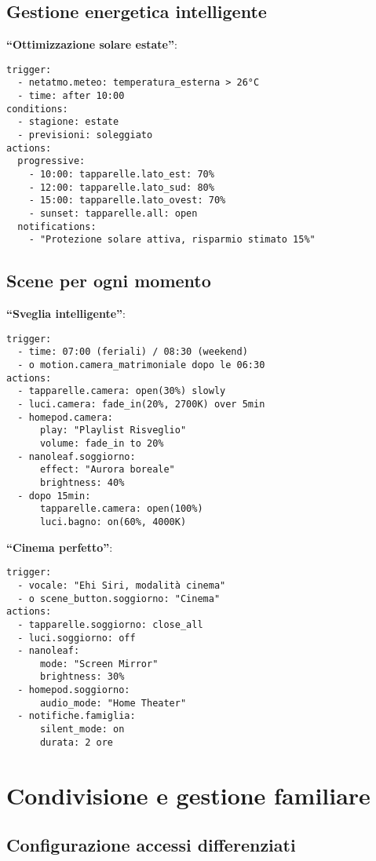 \subsection{Gestione energetica intelligente}

\textbf{``Ottimizzazione solare estate''}:
\begin{verbatim}
trigger:
  - netatmo.meteo: temperatura_esterna > 26°C
  - time: after 10:00
conditions:
  - stagione: estate
  - previsioni: soleggiato
actions:
  progressive:
    - 10:00: tapparelle.lato_est: 70%
    - 12:00: tapparelle.lato_sud: 80%
    - 15:00: tapparelle.lato_ovest: 70%
    - sunset: tapparelle.all: open
  notifications:
    - "Protezione solare attiva, risparmio stimato 15%"
\end{verbatim}

\subsection{Scene per ogni momento}

\textbf{``Sveglia intelligente''}:
\begin{verbatim}
trigger:
  - time: 07:00 (feriali) / 08:30 (weekend)
  - o motion.camera_matrimoniale dopo le 06:30
actions:
  - tapparelle.camera: open(30%) slowly
  - luci.camera: fade_in(20%, 2700K) over 5min
  - homepod.camera: 
      play: "Playlist Risveglio"
      volume: fade_in to 20%
  - nanoleaf.soggiorno: 
      effect: "Aurora boreale"
      brightness: 40%
  - dopo 15min:
      tapparelle.camera: open(100%)
      luci.bagno: on(60%, 4000K)
\end{verbatim}

\textbf{``Cinema perfetto''}:
\begin{verbatim}
trigger:
  - vocale: "Ehi Siri, modalità cinema"
  - o scene_button.soggiorno: "Cinema"
actions:
  - tapparelle.soggiorno: close_all
  - luci.soggiorno: off
  - nanoleaf: 
      mode: "Screen Mirror"
      brightness: 30%
  - homepod.soggiorno:
      audio_mode: "Home Theater"
  - notifiche.famiglia: 
      silent_mode: on
      durata: 2 ore
\end{verbatim}

\section{Condivisione e gestione familiare}

\subsection{Configurazione accessi differenziati}

